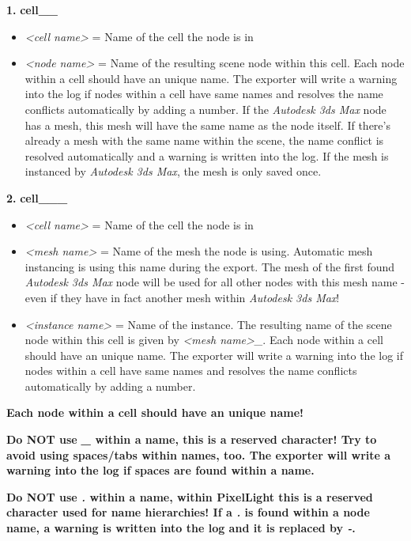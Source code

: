 \textbf{1.}
\textbf{cell\_<cell name>\_<node name>}
\begin{itemize}
\item{\emph{<cell name>} = Name of the cell the node is in}
\item{\emph{<node name>} = Name of the resulting scene node within this cell. Each node within a cell should have an unique name. The exporter will write a warning into the log if nodes within a cell have same names and resolves the name conflicts automatically by adding a number. If the \emph{Autodesk 3ds Max} node has a mesh, this mesh will have the same name as the node itself. If there's already a mesh with the same name within the scene, the name conflict is resolved automatically and a warning is written into the log. If the mesh is instanced by \emph{Autodesk 3ds Max}, the mesh is only saved once.}
\end{itemize}

\textbf{2.}
\textbf{cell\_<cell name>\_<mesh name>\_<instance name>}
\begin{itemize}
\item{\emph{<cell name>} = Name of the cell the node is in}
\item{\emph{<mesh name>} = Name of the mesh the node is using. Automatic mesh instancing is using this name during the export. The mesh of the first found \emph{Autodesk 3ds Max} node will be used for all other nodes with this mesh name - even if they have in fact another mesh within \emph{Autodesk 3ds Max}!}
\item{\emph{<instance name>} = Name of the instance. The resulting name of the scene node within this cell is given by \emph{<mesh name>\_<instance name>}. Each node within a cell should have an unique name. The exporter will write a warning into the log if nodes within a cell have same names and resolves the name conflicts automatically by adding a number.}
\end{itemize}

\textbf{Each node within a cell should have an unique name!}

\textbf{Do NOT use \emph{\_} within a name, this is a reserved character! Try to avoid using spaces/tabs within names, too. The exporter will write a warning into the log if spaces are found within a name.}

\textbf{Do NOT use \emph{.} within a name, within PixelLight this is a reserved character used for name hierarchies! If  a \emph{.} is found within a node name, a warning is written into the log and it is replaced by \emph{-}.}

